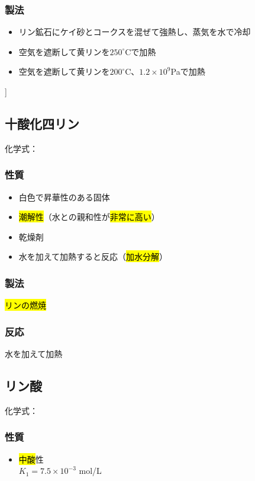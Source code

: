 \subsubsection{製法}
\begin{itemize}
      \item リン鉱石にケイ砂とコークスを混ぜて強熱し、蒸気を水で冷却  \K\\
      \item 空気を遮断して黄リンを$250^{\circ}$Cで加熱 
      \item 空気を遮断して黄リンを$200^{\circ}$C、$1.2\times10^9$Paで加熱 
\end{itemize}
]
      \subsection{十酸化四リン}
      化学式：\hl{}
      \subsubsection{性質}
      \begin{itemize}
            \item 白色で昇華性のある固体
            \item \hl{潮解性}（水との親和性が\hl{非常に高い}）
            \item {乾燥}剤
            \item 水を加えて加熱すると反応（\hl{加水分解}）
      \end{itemize}
      \subsubsection{製法}
      \hl{リンの燃焼}\\
      \subsubsection{反応}
      水を加えて加熱\\
      \newpage
      \subsection{リン酸}
      化学式：\hl{}
      \subsubsection{性質}
      \begin{itemize}
            \item \hl{中酸}性\\
                  \hl{} \hfill $K_{1}=7.5\times10^{-3}$ mol/L
      \end{itemize}
